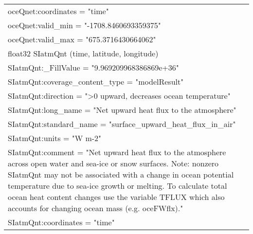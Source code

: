 \begin{longtable}{|p{\textwidth}|}
\hspace{0.5cm}\hspace{0.5cm}oceQnet:coordinates = "time"\\
\hspace{0.5cm}\hspace{0.5cm}oceQnet:valid\_min = "-1708.8460693359375"\\
\hspace{0.5cm}\hspace{0.5cm}oceQnet:valid\_max = "675.3716430664062"\\
\hspace{0.5cm}float32 SIatmQnt (time, latitude, longitude)\\
\hspace{0.5cm}\hspace{0.5cm}SIatmQnt:\_FillValue = "9.969209968386869e+36"\\
\hspace{0.5cm}\hspace{0.5cm}SIatmQnt:coverage\_content\_type = "modelResult"\\
\hspace{0.5cm}\hspace{0.5cm}SIatmQnt:direction = ">0 upward, decreases ocean temperature"\\
\hspace{0.5cm}\hspace{0.5cm}SIatmQnt:long\_name = "Net upward heat flux to the atmosphere"\\
\hspace{0.5cm}\hspace{0.5cm}SIatmQnt:standard\_name = "surface\_upward\_heat\_flux\_in\_air"\\
\hspace{0.5cm}\hspace{0.5cm}SIatmQnt:units = "W m-2"\\
\hspace{0.5cm}\hspace{0.5cm}SIatmQnt:comment = "Net upward heat flux to the atmosphere across open water and sea-ice or snow surfaces. Note: nonzero SIatmQnt may not be associated with a change in ocean potential temperature due to sea-ice growth or melting. To calculate total ocean heat content changes use the variable TFLUX which also accounts for changing ocean mass (e.g. oceFWflx)."\\
\hspace{0.5cm}\hspace{0.5cm}SIatmQnt:coordinates = "time"\\

\end{longtable}
